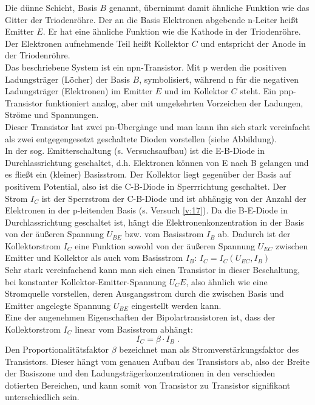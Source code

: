 \noindent
Die dünne Schicht, Basis $B$ genannt, übernimmt damit ähnliche Funktion wie das Gitter der Triodenröhre. Der an die Basis Elektronen abgebende n-Leiter heißt Emitter $E$. Er hat eine ähnliche Funktion wie die Kathode in der Triodenröhre. Der Elektronen aufnehmende Teil heißt Kollektor $C$ und entspricht der Anode in der Triodenröhre.\\
Das beschriebene System ist ein npn-Transistor. Mit p werden die positiven Ladungsträger (Löcher) der Basis $B$, symbolisiert, während n für die negativen Ladungsträger (Elektronen) im Emitter $E$ und im Kollektor $C$ steht. Ein pnp-Transistor funktioniert analog, aber mit umgekehrten Vorzeichen der Ladungen, Ströme und Spannungen.\\

\noindent
Dieser Transistor hat zwei pn-Übergänge und man kann ihn sich stark vereinfacht als zwei entgegengesetzt geschaltete Dioden vorstellen (siehe Abbildung).\\
In der sog. Emitterschaltung (s. Versuchsaufbau) ist die E-B-Diode in Durchlassrichtung geschaltet, d.h. Elektronen können von E nach B gelangen und es fließt ein (kleiner) Basisstrom. Der Kollektor liegt gegenüber der Basis auf positivem Potential, also ist die C-B-Diode in Sperrrichtung geschaltet. Der Strom $I_C$ ist der Sperrstrom der C-B-Diode und ist abhängig von der Anzahl der Elektronen in der p-leitenden Basis (s. Versuch \ref{v:17}). Da die B-E-Diode in Durchlassrichtung geschaltet ist, hängt die Elektronenkonzentration in der Basis von der äußeren Spannung $U_{BE}$ bzw. vom Basisstrom $I_B$ ab. Dadurch ist der Kollektorstrom $I_C$ eine Funktion sowohl von der äußeren Spannung $U_{EC}$ zwischen Emitter und Kollektor als auch vom Basisstrom $I_B$: $I_C = I_C (U_{EC} , I_B)$\\

\noindent
Sehr stark vereinfachend kann man sich einen Transistor in dieser Beschaltung, bei konstanter Kollektor-Emitter-Spannung $U_CE$, also ähnlich wie eine Stromquelle vorstellen, deren Ausgangsstrom durch die zwischen Basis und Emitter angelegte Spannung $U_{BE}$ eingestellt werden kann.\\
Eine der angenehmen Eigenschaften der Bipolartransistoren ist, dass der Kollektorstrom $I_C$ linear vom Basisstrom abhängt:
\begin{equation}
	I_C = \beta\cdot I_B\; .
\end{equation}
Den Proportionalitätsfaktor $\beta$ bezeichnet man als Stromverstärkungsfaktor des Transistors. Dieser hängt vom genauen Aufbau des Transistors ab, also der Breite der Basiszone und den Ladungsträgerkonzentrationen in den verschieden dotierten Bereichen, und kann somit von Transistor zu Transistor signifikant unterschiedlich sein.

